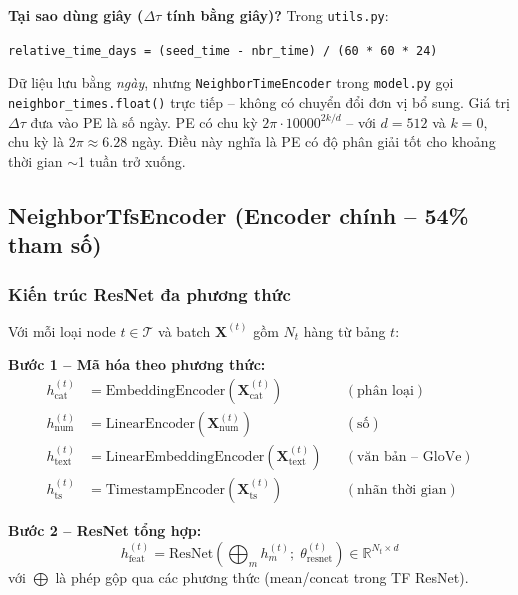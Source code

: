 \documentclass[12pt,a4paper]{article}
\begin{document}
\begin{insightbox}
\textbf{Tại sao dùng giây ($\Delta\tau$ tính bằng giây)?} Trong \texttt{utils.py}:
\begin{center}
\texttt{relative\_time\_days = (seed\_time - nbr\_time) / (60 * 60 * 24)}
\end{center}
Dữ liệu lưu bằng \emph{ngày}, nhưng \texttt{NeighborTimeEncoder} trong
\texttt{model.py} gọi \texttt{neighbor\_times.float()} trực tiếp -- không có
chuyển đổi đơn vị bổ sung. Giá trị $\Delta\tau$ đưa vào PE là số ngày.
PE có chu kỳ $2\pi \cdot 10000^{2k/d}$ -- với $d=512$ và $k=0$, chu kỳ là
$2\pi \approx 6.28$ ngày. Điều này nghĩa là PE có độ phân giải tốt cho
khoảng thời gian $\sim$1 tuần trở xuống.
\end{insightbox}

\subsection{NeighborTfsEncoder (Encoder chính -- 54\% tham số)}

\subsubsection{Kiến trúc ResNet đa phương thức}

\begin{mathbox}[title={Pipeline mã hóa đặc trưng bảng}]
Với mỗi loại node $t \in \mathcal{T}$ và batch $\mathbf{X}^{(t)}$
gồm $N_t$ hàng từ bảng $t$:

\textbf{Bước 1 -- Mã hóa theo phương thức:}
\begin{align}
  h_\text{cat}^{(t)}  &= \text{EmbeddingEncoder}(\mathbf{X}^{(t)}_\text{cat})
    & &(\text{phân loại})\\
  h_\text{num}^{(t)}  &= \text{LinearEncoder}(\mathbf{X}^{(t)}_\text{num})
    & &(\text{số})\\
  h_\text{text}^{(t)} &= \text{LinearEmbeddingEncoder}(\mathbf{X}^{(t)}_\text{text})
    & &(\text{văn bản -- GloVe})\\
  h_\text{ts}^{(t)}   &= \text{TimestampEncoder}(\mathbf{X}^{(t)}_\text{ts})
    & &(\text{nhãn thời gian})
\end{align}

\textbf{Bước 2 -- ResNet tổng hợp:}
\begin{equation}
  h_\text{feat}^{(t)} = \text{ResNet}\!\left(
    \bigoplus_{m} h_m^{(t)};\;
    \theta^{(t)}_\text{resnet}
  \right) \in \mathbb{R}^{N_t \times d}
  \label{eq:tfs_enc}
\end{equation}
với $\bigoplus$ là phép gộp qua các phương thức (mean/concat trong TF ResNet).
\end{mathbox}
\end{document}
